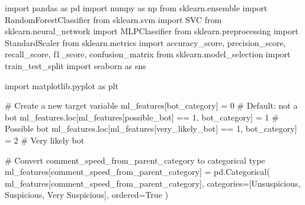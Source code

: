 \documentclass[
  12pt,
  letterpaper,
  DIV=11,
  numbers=noendperiod]{scrartcl}
\newenvironment{Shaded}{\begin{snugshade}}{\end{snugshade}}
\newcommand{\CommentTok}[1]{\textcolor[rgb]{0.37,0.37,0.37}{#1}}
\newcommand{\DecValTok}[1]{\textcolor[rgb]{0.68,0.00,0.00}{#1}}
\newcommand{\ImportTok}[1]{\textcolor[rgb]{0.00,0.46,0.62}{#1}}
\newcommand{\NormalTok}[1]{\textcolor[rgb]{0.00,0.23,0.31}{#1}}
\newcommand{\OperatorTok}[1]{\textcolor[rgb]{0.37,0.37,0.37}{#1}}
\newcommand{\StringTok}[1]{\textcolor[rgb]{0.13,0.47,0.30}{#1}}
\newcommand{\VariableTok}[1]{\textcolor[rgb]{0.07,0.07,0.07}{#1}}
\begin{document}
\begin{Shaded}
\begin{Highlighting}[]
\ImportTok{import}\NormalTok{ pandas }\ImportTok{as}\NormalTok{ pd}
\ImportTok{import}\NormalTok{ numpy }\ImportTok{as}\NormalTok{ np}
\ImportTok{from}\NormalTok{ sklearn.ensemble }\ImportTok{import}\NormalTok{ RandomForestClassifier}
\ImportTok{from}\NormalTok{ sklearn.svm }\ImportTok{import}\NormalTok{ SVC}
\ImportTok{from}\NormalTok{ sklearn.neural\_network }\ImportTok{import}\NormalTok{ MLPClassifier}
\ImportTok{from}\NormalTok{ sklearn.preprocessing }\ImportTok{import}\NormalTok{ StandardScaler}
\ImportTok{from}\NormalTok{ sklearn.metrics }\ImportTok{import}\NormalTok{ accuracy\_score, precision\_score, recall\_score, f1\_score, confusion\_matrix}
\ImportTok{from}\NormalTok{ sklearn.model\_selection }\ImportTok{import}\NormalTok{ train\_test\_split}
\ImportTok{import}\NormalTok{ seaborn }\ImportTok{as}\NormalTok{ sns}

\ImportTok{import}\NormalTok{ matplotlib.pyplot }\ImportTok{as}\NormalTok{ plt}

\CommentTok{\# Create a new target variable}
\NormalTok{ml\_features[}\StringTok{\textquotesingle{}bot\_category\textquotesingle{}}\NormalTok{] }\OperatorTok{=} \DecValTok{0}  \CommentTok{\# Default: not a bot}
\NormalTok{ml\_features.loc[ml\_features[}\StringTok{\textquotesingle{}possible\_bot\textquotesingle{}}\NormalTok{] }\OperatorTok{==} \DecValTok{1}\NormalTok{, }\StringTok{\textquotesingle{}bot\_category\textquotesingle{}}\NormalTok{] }\OperatorTok{=} \DecValTok{1}  \CommentTok{\# Possible bot}
\NormalTok{ml\_features.loc[ml\_features[}\StringTok{\textquotesingle{}very\_likely\_bot\textquotesingle{}}\NormalTok{] }\OperatorTok{==} \DecValTok{1}\NormalTok{, }\StringTok{\textquotesingle{}bot\_category\textquotesingle{}}\NormalTok{] }\OperatorTok{=} \DecValTok{2}  \CommentTok{\# Very likely bot}

\CommentTok{\# Convert comment\_speed\_from\_parent\_category to categorical type}
\NormalTok{ml\_features[}\StringTok{\textquotesingle{}comment\_speed\_from\_parent\_category\textquotesingle{}}\NormalTok{] }\OperatorTok{=}\NormalTok{ pd.Categorical(}
\NormalTok{    ml\_features[}\StringTok{\textquotesingle{}comment\_speed\_from\_parent\_category\textquotesingle{}}\NormalTok{],}
\NormalTok{    categories}\OperatorTok{=}\NormalTok{[}\StringTok{\textquotesingle{}Unsuspicious\textquotesingle{}}\NormalTok{, }\StringTok{\textquotesingle{}Suspicious\textquotesingle{}}\NormalTok{, }\StringTok{\textquotesingle{}Very Suspicious\textquotesingle{}}\NormalTok{],}
\NormalTok{    ordered}\OperatorTok{=}\VariableTok{True}
\NormalTok{)}


\end{Highlighting}
\end{Shaded}
\end{document}
